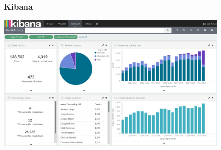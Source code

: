 \begin{frame}
\frametitle{Kibana}

\begin{center}
\includegraphics[width=11.5cm]{figs/elastic-kibana}
\end{center}

\end{frame}







